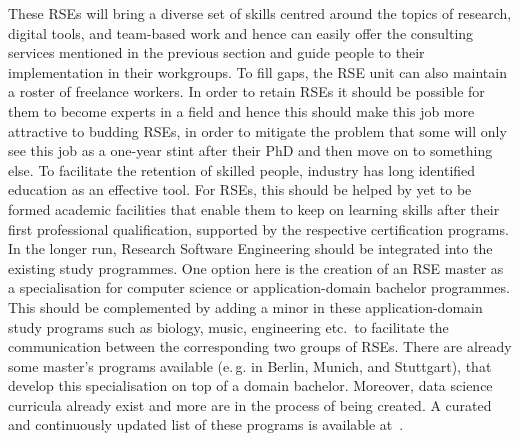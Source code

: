 \documentclass[a4paper]{article}
\makeatletter
\newcommand*{\eg}{e.\,g.\@\xspace}
\makeatother
\begin{document}
These RSEs will bring a diverse set of skills centred around the topics of research,
digital tools, and team-based work and hence can easily offer the consulting services mentioned in the previous section and guide people to their implementation in their workgroups.
To fill gaps, the RSE unit can also maintain a roster of freelance workers.
In order to retain RSEs it should be possible for them to become experts in a field and hence this should make this job more attractive to budding RSEs,
in order to mitigate the problem that some will only see this job as a one-year stint after their PhD and then move on to something else.
To facilitate the retention of skilled people, industry has long identified education as an effective tool.
For RSEs, this should be helped by yet to be formed academic facilities that enable them to keep on learning skills after their first professional qualification, supported by the respective certification programs.
In the longer run, Research Software Engineering should be integrated into the existing study programmes.
One option here is the creation of an RSE master as a specialisation for computer science or application-domain bachelor programmes.
This should be complemented by adding a minor in these application-domain study programs such as biology, music, engineering etc.\ to facilitate the communication between the corresponding two groups of RSEs.
There are already some master's programs available (\eg{} in Berlin, Munich, and Stuttgart), that develop this specialisation on top of a domain bachelor.
Moreover, data science curricula already exist and more are in the process of being created.
A curated and continuously updated list of these programs is available at~\cite{learnandteachlearn}.

\printbibliography[heading=bibintoc]
\end{document}
